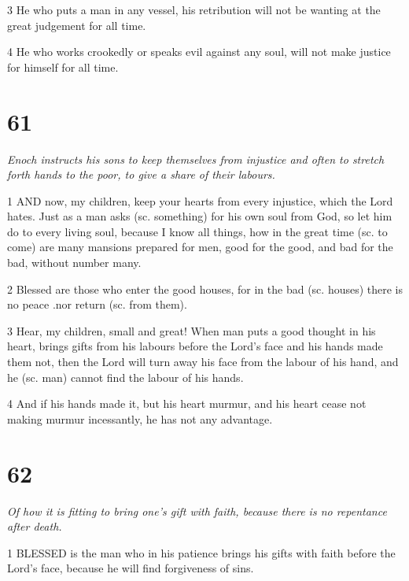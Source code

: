 \par 3 He who puts a man in any vessel, his retribution will not be wanting at the great judgement for all time.

\par 4 He who works crookedly or speaks evil against any soul, will not make justice for himself for all time.

\chapter{61}

\par \textit{Enoch instructs his sons to keep themselves from injustice and often to stretch forth hands to the poor, to give a share of their labours.}

\par 1 AND now, my children, keep your hearts from every injustice, which the Lord hates. Just as a man asks (sc. something) for his own soul from God, so let him do to every living soul, because I know all things, how in the great time (sc. to come) are many mansions prepared for men, good for the good, and bad for the bad, without number many.

\par 2 Blessed are those who enter the good houses, for in the bad (sc. houses) there is no peace .nor return (sc. from them).

\par 3 Hear, my children, small and great! When man puts a good thought in his heart, brings gifts from his labours before the Lord's face and his hands made them not, then the Lord will turn away his face from the labour of his hand, and he (sc. man) cannot find the labour of his hands.

\par 4 And if his hands made it, but his heart murmur, and his heart cease not making murmur incessantly, he has not any advantage.

\chapter{62}

\par \textit{Of how it is fitting to bring one's gift with faith, because there is no repentance after death.}

\par 1 BLESSED is the man who in his patience brings his gifts with faith before the Lord's face, because he will find forgiveness of sins.

